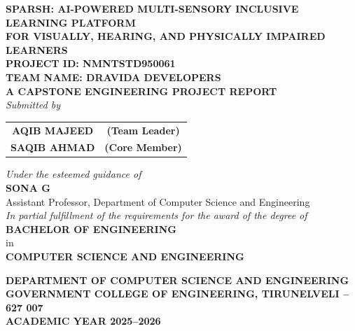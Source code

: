 \documentclass[12pt,a4paper]{report}
\begin{document}
\begin{titlepage}
    \centering
    \vspace*{0.2cm}
    
    {\Large \bfseries SPARSH: AI-POWERED MULTI-SENSORY INCLUSIVE LEARNING PLATFORM}\\[0.3cm]
    {\large \bfseries FOR VISUALLY, HEARING, AND PHYSICALLY IMPAIRED LEARNERS}\\[0.8cm]
    
    {\small \textbf{PROJECT ID: NMNTSTD950061}}\\[0.2cm]
    {\large \textbf{TEAM NAME: DRAVIDA DEVELOPERS}}\\[0.8cm]
    
    {\large \bfseries A CAPSTONE ENGINEERING PROJECT REPORT}\\[0.3cm]
    {\large \textit{Submitted by}}\\[0.5cm]
    
    \begin{table}[h!]
        \centering
        \large
        \renewcommand{\arraystretch}{1.3}
        \begin{tabular}{c c}
            \textbf{AQIB MAJEED} & \textbf{(Team Leader)} \\
            \textbf{SAQIB AHMAD} & \textbf{(Core Member)} \\
        \end{tabular}
    \end{table}
    
    \vspace{0.4cm}
    {\large \textit{Under the esteemed guidance of}}\\[0.2cm]
    {\large \bfseries SONA G}\\[0.1cm]
    {\normalsize Assistant Professor, Department of Computer Science and Engineering}\\[0.8cm]
    
    {\normalsize \textit{In partial fulfillment of the requirements for the award of the degree of}}\\[0.2cm]
    {\large \bfseries BACHELOR OF ENGINEERING}\\[0.1cm]
    {\normalsize in}\\[0.1cm]
    {\large \bfseries COMPUTER SCIENCE AND ENGINEERING}\\[0.8cm]
    
    \vfill
    
    {\large \bfseries DEPARTMENT OF COMPUTER SCIENCE AND ENGINEERING}\\[0.2cm]
    {\large \bfseries GOVERNMENT COLLEGE OF ENGINEERING, TIRUNELVELI -- 627 007}\\[0.2cm]
    {\large \textbf{ACADEMIC YEAR 2025--2026}}
\end{titlepage}
\end{document}
